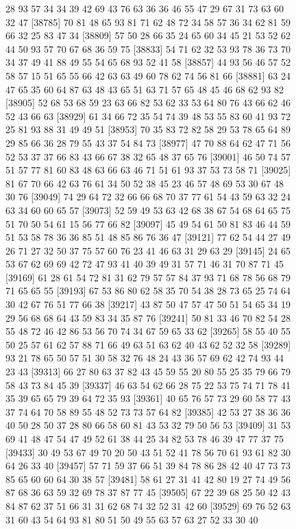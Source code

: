 \documentclass{article}
\begin{document}
\begin{figure}[H]
\begin{Schunk}
\begin{Soutput}
[38761] 28 93 57 34 34 39 42 69 43 76 63 36 36 46 55 47 29 67 31 73 63 60 32 47
[38785] 70 81 48 65 93 81 71 62 48 72 34 58 57 36 34 62 81 59 66 32 25 83 47 34
[38809] 57 50 28 66 35 24 65 60 34 45 21 53 52 62 44 50 93 57 70 67 68 36 59 75
[38833] 54 71 62 32 53 93 78 36 73 70 34 37 49 41 88 49 55 54 65 68 93 52 41 58
[38857] 44 93 56 46 57 52 58 57 15 51 65 55 66 42 63 63 49 60 78 62 74 56 81 66
[38881] 63 24 47 65 35 60 64 87 63 48 43 65 51 63 71 57 65 48 45 46 68 62 93 82
[38905] 52 68 53 68 59 23 63 66 82 53 62 33 53 64 80 76 43 66 62 46 52 43 66 63
[38929] 61 34 66 72 35 54 74 39 48 53 55 83 60 41 93 72 25 81 93 88 31 49 49 51
[38953] 70 35 83 72 82 58 29 53 78 65 64 89 29 85 66 36 28 79 55 43 37 54 84 73
[38977] 47 70 88 64 62 47 71 56 52 53 37 37 66 83 43 66 67 38 32 65 48 37 65 76
[39001] 46 50 74 57 51 57 77 81 60 83 48 63 66 63 46 71 51 61 93 37 53 73 58 71
[39025] 81 67 70 66 42 63 76 61 34 50 52 38 45 23 46 57 48 69 53 30 67 48 30 76
[39049] 74 29 64 72 32 66 66 68 70 37 77 61 54 43 59 63 32 24 63 34 60 60 65 57
[39073] 52 59 49 53 63 42 68 38 67 54 68 64 65 75 51 70 50 54 61 15 56 77 66 82
[39097] 45 49 54 61 50 81 83 46 44 59 51 53 58 78 36 36 85 51 48 85 86 76 36 47
[39121] 77 62 54 44 27 49 26 71 27 32 50 37 75 57 60 76 23 41 46 63 31 29 63 29
[39145] 24 65 53 67 62 69 69 42 72 47 93 41 40 39 49 31 57 71 46 31 70 87 71 45
[39169] 61 28 61 54 72 81 31 62 79 57 57 84 37 93 71 68 78 56 68 79 71 65 65 55
[39193] 67 53 86 80 62 58 35 70 54 38 28 73 65 25 74 64 30 42 67 76 51 77 66 38
[39217] 43 87 50 47 57 47 50 51 54 65 34 19 29 56 68 68 64 43 59 83 34 35 87 76
[39241] 50 81 33 46 70 82 54 28 55 48 72 46 42 86 53 56 70 74 34 67 59 65 33 62
[39265] 58 55 40 55 50 25 57 61 62 57 88 71 66 49 63 51 63 62 40 43 62 52 32 58
[39289] 93 21 78 65 50 57 51 30 58 32 76 48 24 43 36 57 69 62 42 74 93 44 23 43
[39313] 66 27 80 63 37 82 43 45 59 55 20 80 55 25 35 79 66 79 58 43 73 84 45 39
[39337] 46 63 54 62 66 28 75 22 53 75 74 71 78 41 35 39 65 65 79 39 64 72 35 93
[39361] 40 65 76 57 73 29 60 58 77 43 37 74 64 70 58 89 55 48 52 73 73 57 64 82
[39385] 42 53 27 38 36 36 40 50 28 50 37 28 80 66 58 60 81 43 53 32 79 50 56 53
[39409] 31 53 69 41 48 47 54 47 49 52 61 38 44 25 34 82 53 78 46 39 47 77 37 75
[39433] 30 49 53 67 49 70 20 50 43 51 52 41 78 56 70 61 93 61 82 30 64 26 33 40
[39457] 57 71 59 37 66 51 39 84 78 86 28 42 40 47 73 73 85 65 60 60 64 30 38 57
[39481] 58 61 27 31 41 42 80 19 27 74 49 56 87 68 36 63 59 32 69 78 37 87 77 45
[39505] 67 22 39 68 25 50 42 43 84 87 62 37 51 66 31 31 62 68 74 32 52 31 42 60
[39529] 69 76 52 63 31 60 43 54 64 93 81 80 51 50 49 55 63 57 63 27 52 33 30 40

\end{Soutput}
\end{Schunk}
\end{figure}
\end{document}
